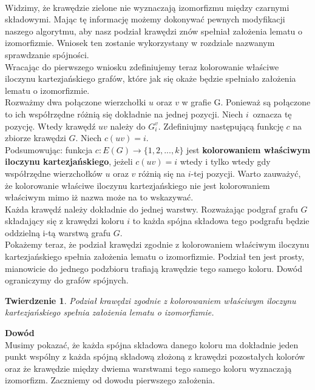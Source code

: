 \documentclass[12pt,a4paper,titlepage]{article}
\newtheorem{twr}{Twierdzenie}
\newcommand\tab[1][1cm]{\hspace*{#1}}
\begin{document}
\\
\tab[0.6cm]Widzimy, że krawędzie zielone nie wyznaczają izomorfizmu między czarnymi składowymi. Mając tę informację możemy dokonywać pewnych modyfikacji naszego algorytmu, aby nasz podział krawędzi znów spełniał założenia lematu o izomorfizmie. Wniosek ten zostanie wykorzystany w rozdziale nazwanym sprawdzanie spójności.\\
\tab[0.6cm]Wracając do pierwszego wniosku zdefiniujemy teraz kolorowanie właściwe iloczynu kartezjańskiego grafów, które jak się okaże będzie spełniało założenia lematu o izomorfizmie.\\

Rozważmy dwa połączone wierzchołki $u$ oraz $v$ w grafie G. Ponieważ są połączone to ich współrzędne różnią się dokładnie na jednej pozycji. Niech $i$~oznacza tę pozycję. Wtedy krawędź $uv$ należy do $G_i^v$. Zdefiniujmy następującą funkcję $c$ na zbiorze krawędzi $G$. Niech $c(uv) = i$.\\
\tab[0.6cm]Podsumowując: funkcja $c: E(G) \rightarrow \{1,2,...,k\}$ jest \textbf{kolorowaniem właściwym iloczynu kartezjańskiego}, jeżeli $c(uv) = i $ wtedy i tylko wtedy gdy współrzędne wierzchołków $u$ oraz $v$ różnią się na $i$-tej pozycji. Warto zauważyć, że kolorowanie właściwe iloczynu kartezjańskiego nie jest kolorowaniem właściwym mimo iż nazwa może na to wskazywać.\\
\tab[0.6cm]Każda krawędź należy dokładnie do jednej warstwy. Rozważając podgraf grafu $G$ składający się z krawędzi koloru $i$ to każda spójna składowa tego podgrafu będzie oddzielną i-tą warstwą grafu $G$.\\
\tab[0.6cm]Pokażemy teraz, że podział krawędzi zgodnie z kolorowaniem właściwym iloczynu kartezjańskiego spełnia założenia lematu o izomorfizmie. Podział ten jest prosty, mianowicie do jednego podzbioru trafiają krawędzie tego samego koloru. Dowód ograniczymy do grafów spójnych.\\
\begin{twr}
Podział krawędzi zgodnie z kolorowaniem właściwym iloczynu kartezjańskiego spełnia założenia lematu o izomorfizmie.
\end{twr}
\tab[-0.6cm]\textbf{Dowód}\\
\tab[0.6cm]Musimy pokazać, że każda spójna składowa danego koloru ma dokładnie jeden punkt wspólny z każda spójną składową złożoną z krawędzi pozostałych kolorów oraz że krawędzie między dwiema warstwami tego samego koloru wyznaczają izomorfizm. Zaczniemy od dowodu pierwszego założenia.\\ 
\end{document}
